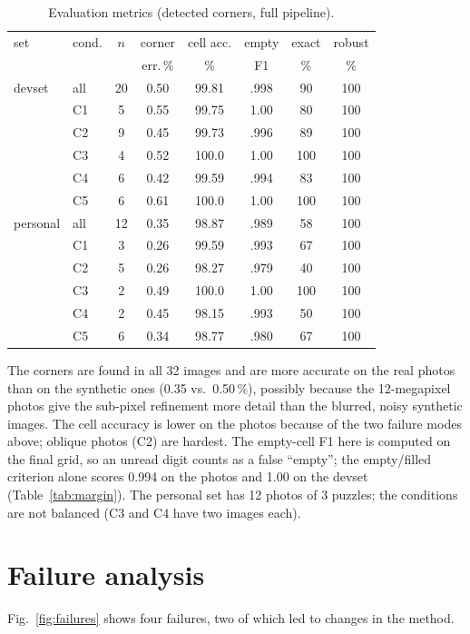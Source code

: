 \documentclass[conference]{IEEEtran}
\begin{document}
\begin{table}[t]
\centering
\caption{Evaluation metrics (detected corners, full pipeline).}
\label{tab:results}
\setlength{\tabcolsep}{3.5pt}
\footnotesize
\begin{tabular}{@{}llcccccc@{}}
\toprule
set & cond. & $n$ & corner & cell acc. & empty & exact & robust\\
 & & & err.\,\% & \% & F1 & \% & \%\\
\midrule
devset & all & 20 & 0.50 & 99.81 & .998 & 90 & 100\\
 & C1 & 5 & 0.55 & 99.75 & 1.00 & 80 & 100\\
 & C2 & 9 & 0.45 & 99.73 & .996 & 89 & 100\\
 & C3 & 4 & 0.52 & 100.0 & 1.00 & 100 & 100\\
 & C4 & 6 & 0.42 & 99.59 & .994 & 83 & 100\\
 & C5 & 6 & 0.61 & 100.0 & 1.00 & 100 & 100\\
\midrule
personal & all & 12 & 0.35 & 98.87 & .989 & 58 & 100\\
 & C1 & 3 & 0.26 & 99.59 & .993 & 67 & 100\\
 & C2 & 5 & 0.26 & 98.27 & .979 & 40 & 100\\
 & C3 & 2 & 0.49 & 100.0 & 1.00 & 100 & 100\\
 & C4 & 2 & 0.45 & 98.15 & .993 & 50 & 100\\
 & C5 & 6 & 0.34 & 98.77 & .980 & 67 & 100\\
\bottomrule
\end{tabular}
\end{table}

The corners are found in all 32 images and are more accurate on the real photos than on the
synthetic ones (0.35 vs.\ 0.50\,\%), possibly because the 12-megapixel photos give the
sub-pixel refinement more detail than the blurred, noisy synthetic images. The cell accuracy is lower on the photos because of the two
failure modes above; oblique photos (C2) are hardest. The empty-cell F1 here is computed on the
final grid, so an unread digit counts as a false ``empty''; the empty/filled criterion alone
scores 0.994 on the photos and 1.00 on the devset (Table~\ref{tab:margin}). The personal set
has 12 photos of 3 puzzles; the conditions are not balanced (C3 and C4 have two images each).

\section{Failure analysis}\label{sec:failures}
Fig.~\ref{fig:failures} shows four failures, two of which led to changes in the method.
\end{document}
